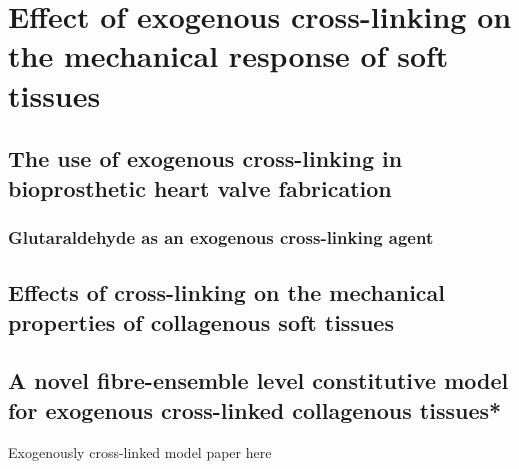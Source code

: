 \chapter{Effect of exogenous cross-linking on the mechanical response of soft tissues}
\section{The use of exogenous cross-linking in bioprosthetic heart valve fabrication}
\subsection{Glutaraldehyde as an exogenous cross-linking agent}
\section{Effects of cross-linking on the mechanical properties of collagenous soft tissues}
\section{A novel fibre-ensemble level constitutive model for exogenous cross-linked collagenous tissues*}

Exogenously cross-linked model paper here